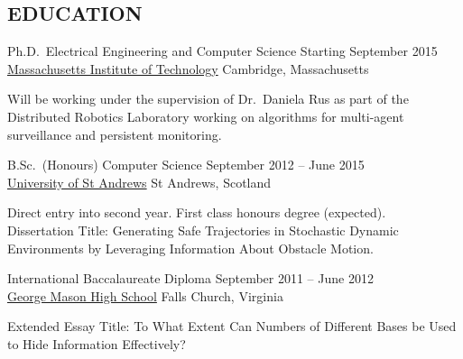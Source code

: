 \documentclass[line,margin]{cv}
\begin{document}
\address{email: \href{mailto:wallar@mit.edu}{wallar@mit.edu}}
\address{website: \href{http://aw204.host.cs.st-andrews.ac.uk}
{http://aw204.host.cs.st-andrews.ac.uk}}

\begin{resume}


\section{EDUCATION}

Ph.D.\ Electrical Engineering and Computer Science
\hfill Starting September 2015 \\
\href{http://mit.edu}{Massachusetts Institute of Technology} \hfill Cambridge, Massachusetts
\begin{adjustwidth}{2.5em}{2.5em}

    Will be working under the supervision of Dr.\ Daniela Rus as part of the
    Distributed Robotics Laboratory working on algorithms for multi-agent
    surveillance and persistent monitoring.

\end{adjustwidth}

B.Sc.\ (Honours) Computer Science
\hfill September 2012 -- June 2015 \\
\href{http://www.st-andrews.ac.uk}{University of St Andrews} \hfill St Andrews, Scotland
\begin{adjustwidth}{2.5em}{2.5em}

    Direct entry into second year. First class honours degree (expected).\\
    Dissertation Title: Generating Safe Trajectories in Stochastic Dynamic
    Environments by Leveraging Information About Obstacle Motion.

\end{adjustwidth}

International Baccalaureate Diploma
\hfill September 2011 -- June 2012 \\
\href{http://www.fccps.org/gm/}{George Mason High School} \hfill Falls Church, Virginia
\begin{adjustwidth}{2.5em}{2.5em}

    Extended Essay Title: To What Extent Can Numbers of Different Bases be Used
    to Hide Information Effectively?


\end{adjustwidth}
\end{resume}
\end{document}
